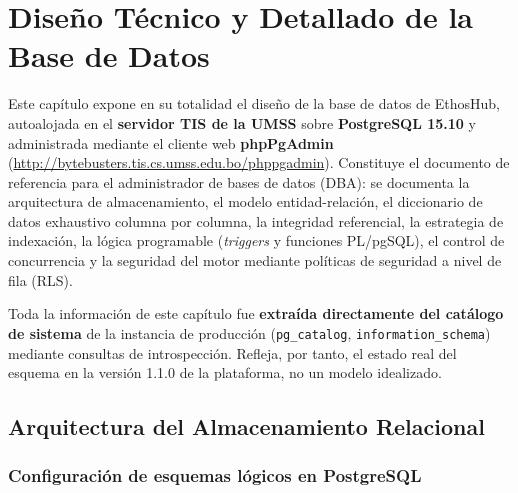 \chapter{Diseño Técnico y Detallado de la Base de Datos}
\label{ch:basedatos}

Este capítulo expone en su totalidad el diseño de la base de datos de EthosHub,
autoalojada en el \textbf{servidor TIS de la UMSS} sobre \textbf{PostgreSQL 15.10} y
administrada mediante el cliente web \textbf{phpPgAdmin}
(\url{http://bytebusters.tis.cs.umss.edu.bo/phppgadmin}). Constituye el documento de
referencia para el administrador de bases de datos (DBA): se documenta la arquitectura
de almacenamiento, el modelo entidad-relación, el diccionario de datos exhaustivo
columna por columna, la integridad referencial, la estrategia de indexación, la lógica
programable (\textit{triggers} y funciones PL/pgSQL), el control de concurrencia y la
seguridad del motor mediante políticas de seguridad a nivel de fila (RLS).

\begin{NotaTecnica}
Toda la información de este capítulo fue \textbf{extraída directamente del catálogo de
sistema} de la instancia de producción (\texttt{pg\_catalog}, \texttt{information\_schema})
mediante consultas de introspección. Refleja, por tanto, el estado real del esquema en
la versión 1.1.0 de la plataforma, no un modelo idealizado.
\end{NotaTecnica}

\section{Arquitectura del Almacenamiento Relacional}
\label{sec:arq_almacenamiento}

\subsection{Configuración de esquemas lógicos en PostgreSQL}
\label{subsec:esquemas}

